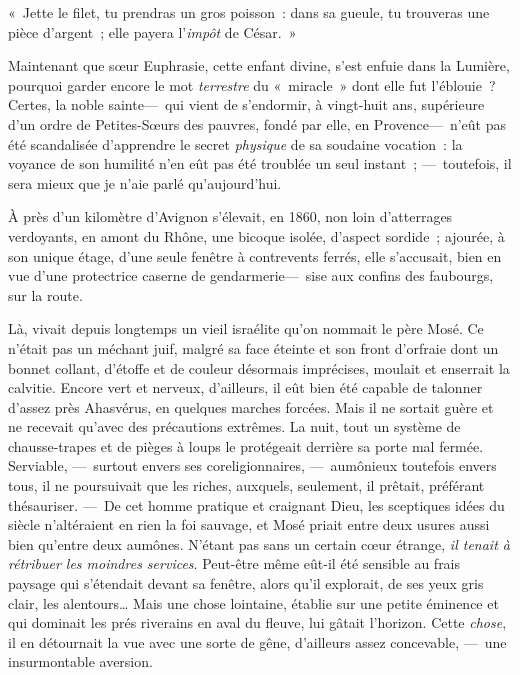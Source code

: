 \documentclass[french,twoside]{book} %
\newcommand{\bibl}[1]{{\RaggedLeft{#1}\par\bigskip}}
\newcommand{\salute}[1]{\bigbreak{#1}\par\medbreak}
\begin{document}
\salute{À monsieur Gustave de Malherbe}
\noindent « Jette le filet, tu prendras un gros poisson : dans sa gueule, tu trouveras une pièce d’argent ; elle payera l’\emph{impôt} de César. »\par

\bibl{Nouveau Testament.}
\noindent Maintenant que sœur Euphrasie, cette enfant divine, s’est enfuie dans la Lumière, pourquoi garder encore le mot \emph{terrestre} du « miracle » dont elle fut l’éblouie ? Certes, la noble sainte— qui vient de s’endormir, à vingt-huit ans, supérieure d’un ordre de Petites-Sœurs des pauvres, fondé par elle, en Provence— n’eût pas été scandalisée d’apprendre le secret \emph{physique} de sa soudaine vocation : la voyance de son humilité n’en eût pas été troublée un seul instant ; — toutefois, il sera mieux que je n’aie parlé qu’aujourd’hui.\par
   À près d’un kilomètre d’Avignon s’élevait, en 1860, non loin d’atterrages verdoyants, en amont du Rhône, une bicoque isolée, d’aspect sordide ; ajourée, à son unique étage, d’une seule fenêtre à contrevents ferrés, elle s’accusait, bien en vue d’une protectrice caserne de gendarmerie— sise aux confins des faubourgs, sur la route.\par
Là, vivait depuis longtemps un vieil israélite qu’on nommait le père Mosé. Ce n’était pas un méchant juif, malgré sa face éteinte et son front d’orfraie dont un bonnet collant, d’étoffe et de couleur désormais imprécises, moulait et enserrait la calvitie. Encore vert et nerveux, d’ailleurs, il eût bien été capable de talonner d’assez près Ahasvérus, en quelques marches forcées. Mais il ne sortait guère et ne recevait qu’avec des précautions extrêmes. La nuit, tout un système de chausse-trapes et de pièges à loups le protégeait derrière sa porte mal fermée. Serviable, — surtout envers ses coreligionnaires, — aumônieux toutefois envers tous, il ne poursuivait que les riches, auxquels, seulement, il prêtait, préférant thésauriser. — De cet homme pratique   et craignant Dieu, les sceptiques idées du siècle n’altéraient en rien la foi sauvage, et Mosé priait entre deux usures aussi bien qu’entre deux aumônes. N’étant pas sans un certain cœur étrange, \emph{il tenait à rétribuer les moindres services}. Peut-être même eût-il été sensible au frais paysage qui s’étendait devant sa fenêtre, alors qu’il explorait, de ses yeux gris clair, les alentours… Mais une chose lointaine, établie sur une petite éminence et qui dominait les prés riverains en aval du fleuve, lui gâtait l’horizon. Cette \emph{chose}, il en détournait la vue avec une sorte de gêne, d’ailleurs assez concevable, — une insurmontable aversion.\par
\end{document}
